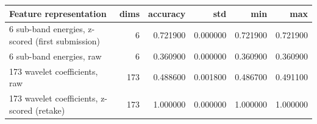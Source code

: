 \begin{tabular}{lrrrrr}
\toprule
Feature representation & dims & accuracy & std & min & max \\
\midrule
6 sub-band energies, z-scored (first submission) & 6 & 0.721900 & 0.000000 & 0.721900 & 0.721900 \\
6 sub-band energies, raw & 6 & 0.360900 & 0.000000 & 0.360900 & 0.360900 \\
173 wavelet coefficients, raw & 173 & 0.488600 & 0.001800 & 0.486700 & 0.491100 \\
173 wavelet coefficients, z-scored (retake) & 173 & 1.000000 & 0.000000 & 1.000000 & 1.000000 \\
\bottomrule
\end{tabular}
